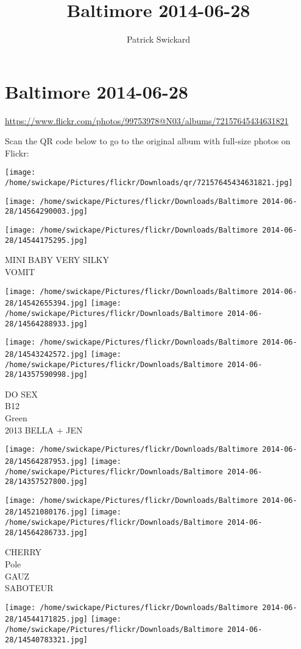 \documentclass[10pt,letterpaper]{article}
\title{Baltimore 2014-06-28}
\author{Patrick Swickard}
\date{}
\begin{document}
\section*{Baltimore 2014-06-28}

\url{https://www.flickr.com/photos/99753978@N03/albums/72157645434631821}

Scan the QR code below to go to the original album with full-size photos on Flickr:

\texttt{[image: /home/swickape/Pictures/flickr/Downloads/qr/72157645434631821.jpg]}
\pagebreak

\texttt{[image: /home/swickape/Pictures/flickr/Downloads/Baltimore 2014-06-28/14564290003.jpg]}

\vspace{0.25in}
\texttt{[image: /home/swickape/Pictures/flickr/Downloads/Baltimore 2014-06-28/14544175295.jpg]}

MINI BABY VERY SILKY\\
VOMIT
\pagebreak

\texttt{[image: /home/swickape/Pictures/flickr/Downloads/Baltimore 2014-06-28/14542655394.jpg]}
\texttt{[image: /home/swickape/Pictures/flickr/Downloads/Baltimore 2014-06-28/14564288933.jpg]}

\texttt{[image: /home/swickape/Pictures/flickr/Downloads/Baltimore 2014-06-28/14543242572.jpg]}
\texttt{[image: /home/swickape/Pictures/flickr/Downloads/Baltimore 2014-06-28/14357590998.jpg]}

DO SEX\\
B12\\
Green\\
2013 BELLA + JEN
\pagebreak

\texttt{[image: /home/swickape/Pictures/flickr/Downloads/Baltimore 2014-06-28/14564287953.jpg]}
\texttt{[image: /home/swickape/Pictures/flickr/Downloads/Baltimore 2014-06-28/14357527800.jpg]}

\texttt{[image: /home/swickape/Pictures/flickr/Downloads/Baltimore 2014-06-28/14521080176.jpg]}
\texttt{[image: /home/swickape/Pictures/flickr/Downloads/Baltimore 2014-06-28/14564286733.jpg]}

CHERRY\\
Pole\\
GAUZ\\
SABOTEUR
\pagebreak

\texttt{[image: /home/swickape/Pictures/flickr/Downloads/Baltimore 2014-06-28/14544171825.jpg]}
\texttt{[image: /home/swickape/Pictures/flickr/Downloads/Baltimore 2014-06-28/14540783321.jpg]}
\end{document}
